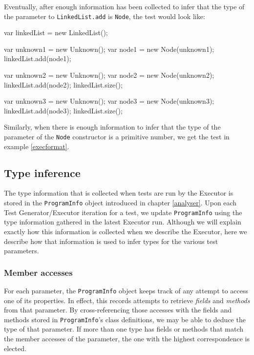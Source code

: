 Eventually, after enough information has been collected to infer that the type of the parameter to \texttt{LinkedList.add} is \texttt{Node}, the test would look like:

\begin{code}[caption=After type inference for \texttt{LinkedList.add}, label=firstinference]
   var linkedList = new LinkedList();
   
   var unknown1 = new Unknown();
   var node1 = new Node(unknown1);
   linkedList.add(node1);
   
   var unknown2 = new Unknown();
   var node2 = new Node(unknown2);
   linkedList.add(node2);
   linkedList.size();

   var unknown3 = new Unknown();
   var node3 = new Node(unknown3);
   linkedList.add(node3);
   linkedList.size();
\end{code}

Similarly, when there is enough information to infer that the type of the parameter of the \texttt{Node} constructor is a primitive number, we get the test in example \ref{execformat}.

\subsection{Type inference}
\label{typeinference}
The type information that is collected when tests are run by the \textsf{Executor} is stored in the \texttt{ProgramInfo} object introduced in chapter \ref{analyser}. Upon each \textsf{Test Generator}/\textsf{Executor} iteration for a test, we update \texttt{ProgramInfo} using the type information gathered in the latest \textsf{Executor} run. Although we will explain exactly how this information is collected when we describe the \textsf{Executor}, here we describe how that information is used to infer types for the various test parameters.

\subsubsection{Member accesses}
For each parameter, the \texttt{ProgramInfo} object keeps track of any attempt to access one of its properties. In effect, this records attempts to retrieve \emph{fields} and \emph{methods} from that parameter. By cross-referencing those accesses with the fields and methods stored in \texttt{ProgramInfo}'s class definitions, we may be able to deduce the type of that parameter. If more than one type has fields or methods that match the member accesses of the parameter, the one with the highest correspondence is elected.

